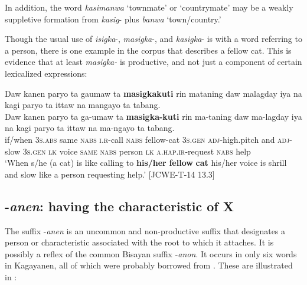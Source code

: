 \hspace*{-.7pt}In addition, the word \textit{kasimanwa} ‘townmate’ or ‘countrymate’ may be a weakly suppletive formation from \textit{kasig}{}- plus  \textit{banwa} ‘town/country.’

Though the usual use of \textit{isigka}{}-, \textit{masigka}{}-, and \textit{kasigka}{}- is with a word referring to a person, there is one example in the corpus that describes a fellow cat. This is evidence that at least \textit{masigka-} is productive, and not just a component of certain lexicalized expressions:

\ea
Daw  kanen  paryo  ta  gaumaw  ta  \textbf{masigkakuti} rin  mataning  daw  malagday  iya  na   kagi paryo  ta  ittaw  na mangayo  ta  tabang. \\\smallskip
 \gll Daw  kanen  paryo  ta  ga-umaw  ta  \textbf{masigka-kuti} rin\footnotemark{}   ma-taning  daw  ma-lagday  iya  na   kagi paryo  ta  ittaw  na ma-ngayo  ta  tabang. \\
if/when  3\textsc{s.abs}  same  \textsc{nabs}  \textsc{i.r}-call  \textsc{nabs}  fellow-cat 3\textsc{s.gen}  \textsc{adj}-high.pitch  and  \textsc{adj}-slow  3\textsc{s.gen}  \textsc{lk}  voice \textsc{same}  \textsc{nabs}  person  \textsc{lk} \textsc{a.hap.ir}-request   \textsc{nabs}  help \\
\glt `When s/he (a cat) is like calling to \textbf{his/her} \textbf{fellow} \textbf{cat} his/her voice is shrill and slow like a person requesting help.’ [JCWE-T-14 13.3]
\z
\subsection{{}-\textit{anen}: having the characteristic of X}
\label{sec:anen}

The suffix -\textit{anen} is an uncommon and non-productive suffix that designates a person or characteristic associated with the root to which it attaches. It is possibly a reflex of the common Bisayan suffix -\textit{anon}. It occurs in only six words in Kagayanen, all of which were probably borrowed from . These are illustrated in :

